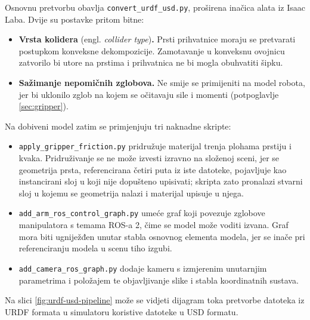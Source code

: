 Osnovnu pretvorbu obavlja \texttt{convert\_urdf\_usd.py}, proširena inačica alata iz Isaac
Laba. Dvije su postavke pritom bitne:

\begin{itemize}
    \item \textbf{Vrsta kolidera} (engl. \textit{collider type})\textbf{.} Prsti prihvatnice
          moraju se pretvarati postupkom konveksne dekompozicije. Zamotavanje u konveksnu
          ovojnicu zatvorilo bi utore na prstima i prihvatnica ne bi mogla obuhvatiti šipku.
    \item \textbf{Sažimanje nepomičnih zglobova.} Ne smije se primijeniti na model robota, jer
          bi uklonilo zglob na kojem se očitavaju sile i momenti (potpoglavlje \ref{sec:gripper}).
\end{itemize}

Na dobiveni model zatim se primjenjuju tri naknadne skripte:

\begin{itemize}
    \item \texttt{apply\_gripper\_friction.py} pridružuje materijal trenja plohama prstiju i
          kvaka. Pridruživanje se ne može izvesti izravno na složenoj sceni, jer se geometrija
          prsta, referencirana četiri puta iz iste datoteke, pojavljuje kao instancirani sloj u
          koji nije dopušteno upisivati; skripta zato pronalazi stvarni sloj u kojemu se geometrija
          nalazi i materijal upisuje u njega.
    \item \texttt{add\_arm\_ros\_control\_graph.py} umeće graf koji povezuje zglobove
          manipulatora s temama ROS-a 2, čime se model može voditi izvana. Graf mora biti
          ugniježđen unutar stabla osnovnog elementa modela, jer se inače pri referenciranju
          modela u scenu tiho izgubi.
    \item \texttt{add\_camera\_ros\_graph.py} dodaje kameru s izmjerenim unutarnjim parametrima i
          položajem te objavljivanje slike i stabla koordinatnih sustava.
\end{itemize}

Na slici \ref{fig:urdf-usd-pipeline} može se vidjeti dijagram toka pretvorbe datoteka iz URDF formata u
simulatoru koristive datoteke u USD formatu.

